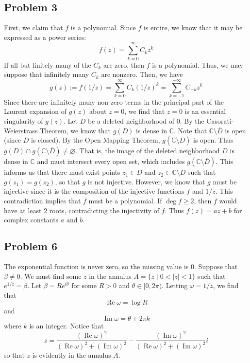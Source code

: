 \documentclass[12pt]{article}
\newcommand{\cc}{{\mathbb C}}
\DeclareMathOperator{\imag}{Im}
\DeclareMathOperator{\re}{Re}
\begin{document}
\subsection*{Problem 3}
First, we claim that $f$ is a polynomial. Since $f$ is entire, we know that it may be expressed as a power series:
\[
f(z) = \sum_{k=0}^\infty C_k z^k
\] If all but finitely many of the $C_k$ are zero, then $f$ is a polynomial. Thus, we may suppose that infinitely many $C_k$ are nonzero. Then, we have
\[
g(z) := f(1/z) = \sum_{k=0}^\infty C_k (1/z)^k = \sum_{k=-1}^{-\infty} C_{-k} z^k
\] Since there are infinitely many non-zero terms in the principal part of the Laurent expansion of $g(z)$ about $z=0$, we find that $z=0$ is an essential singularity of $g(z)$. Let $D$ be a deleted neighborhood of $0$. By the Casorati-Weierstrass Theorem, we know that $g(D)$ is dense in $\cc$. Note that $\cc \setminus \overline{D}$ is open (since $\overline{D}$ is closed). By the Open Mapping Theorem, $g(\cc\setminus \overline{D})$ is open. Thus $g(D) \cap g(\cc\setminus \overline{D}) \neq \varnothing$. That is, the image of the deleted neighborhood $D$ is dense in $\cc$ and must intersect every open set, which includes $g(\cc\setminus \overline{D})$. This informs us that there must exist points $z_1 \in D$ and $z_2 \in \cc \setminus \overline{D}$ such that $g(z_1) = g(z_2)$, so that $g$ is not injective. However, we know that $g$ must be injective since it is the composition of the injective functions $f$ and $1/z$. This contradiction implies that $f$ must be a polynomial. If $\deg f \geq 2$, then $f$ would have at least $2$ roots, contradicting the injectivity of $f$. Thus $f(z) = az+ b$ for complex constants $a$ and $b$.
\newpage
\subsection*{Problem 6}
The exponential function is never zero, so the missing value is $0$. Suppose that $\beta \neq 0$. We must find some $z$ in the annulus $A = \{z \mid 0 < \vert z \vert < 1\}$ such that $e^{1/z} = \beta$. Let $\beta = Re^{i\theta}$ for some $R > 0$ and $\theta \in [0,2\pi)$. Letting $\omega = 1/z$, we find that
\[
\re \omega = \log R
\] and
\[
\imag \omega = \theta+2\pi k
\] where $k$ is an integer. Notice that
\[
z = \frac{(\re \omega)^2} {(\re \omega)^2 + (\imag \omega)^2} - \frac{(\imag \omega)^2}{(\re \omega)^2 + (\imag \omega)^2}i
\] so that $z$ is evidently in the annulus $A$.
\newpage
\end{document}
